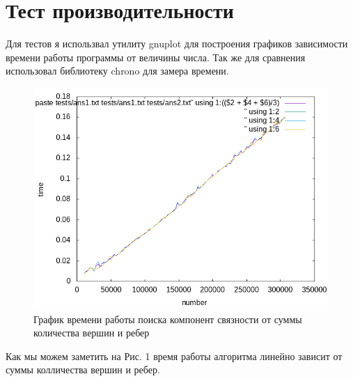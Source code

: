 
\section{Тест производительности}

Для тестов я использвал утилиту gnuplot для построения графиков зависимости времени работы программы от величины числа. Так же для сравнения использовал библиотеку chrono для замера времени.

\begin{figure}[h]
  \begin{center}
    \includegraphics[scale=0.8]{../plots/plot1.png}
  \end{center}
  \caption{График времени работы поиска компонент связности от суммы количества вершин и ребер}
\end{figure}

Как мы можем заметить на Рис. 1 время работы алгоритма линейно зависит от суммы колличества вершин и ребер.

\pagebreak
